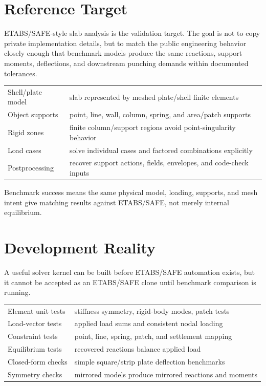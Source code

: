 \documentclass[10pt]{article}
\begin{document}
\section{Reference Target}

ETABS/SAFE-style slab analysis is the validation target. The goal is not to
copy private implementation details, but to match the public engineering
behavior closely enough that benchmark models produce the same reactions,
support moments, deflections, and downstream punching demands within documented
tolerances.


{\ttfamily\footnotesize
\begin{tabular}{@{}p{1.8in}p{4.7in}@{}}
Shell/plate model & slab represented by meshed plate/shell finite elements \\
Object supports & point, line, wall, column, spring, and area/patch supports \\
Rigid zones & finite column/support regions avoid point-singularity behavior \\
Load cases & solve individual cases and factored combinations explicitly \\
Postprocessing & recover support actions, fields, envelopes, and code-check inputs \\
\end{tabular}
}

Benchmark success means the same physical model, loading, supports, and mesh
intent give matching results against ETABS/SAFE, not merely internal
equilibrium.

\section{Development Reality}

A useful solver kernel can be built before ETABS/SAFE automation exists, but it
cannot be accepted as an ETABS/SAFE clone until benchmark comparison is running.


{\ttfamily\footnotesize
\begin{tabular}{@{}p{2.0in}p{4.5in}@{}}
Element unit tests & stiffness symmetry, rigid-body modes, patch tests \\
Load-vector tests & applied load sums and consistent nodal loading \\
Constraint tests & point, line, spring, patch, and settlement mapping \\
Equilibrium tests & recovered reactions balance applied load \\
Closed-form checks & simple square/strip plate deflection benchmarks \\
Symmetry checks & mirrored models produce mirrored reactions and moments \\
\end{tabular}
}
\end{document}
